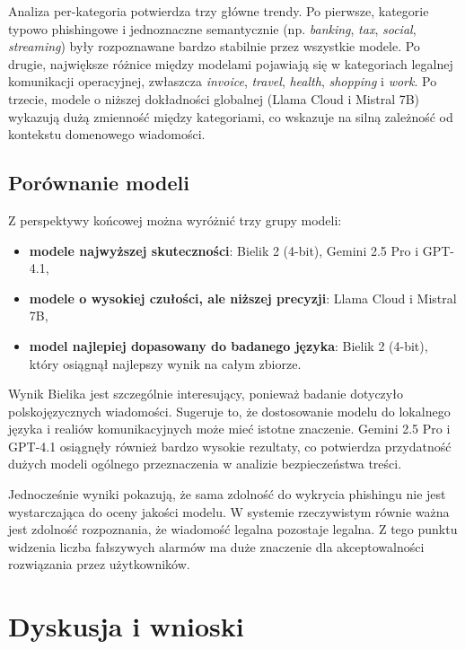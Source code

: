 \documentclass[12pt,a4paper,openright]{report}
\begin{document}
Analiza per-kategoria potwierdza trzy główne trendy. Po pierwsze, kategorie typowo phishingowe i jednoznaczne semantycznie (np. \textit{banking}, \textit{tax}, \textit{social}, \textit{streaming}) były rozpoznawane bardzo stabilnie przez wszystkie modele. Po drugie, największe różnice między modelami pojawiają się w kategoriach legalnej komunikacji operacyjnej, zwłaszcza \textit{invoice}, \textit{travel}, \textit{health}, \textit{shopping} i \textit{work}. Po trzecie, modele o niższej dokładności globalnej (Llama Cloud i Mistral 7B) wykazują dużą zmienność między kategoriami, co wskazuje na silną zależność od kontekstu domenowego wiadomości.

\section{Porównanie modeli}

Z perspektywy końcowej można wyróżnić trzy grupy modeli:

\begin{itemize}
    \item \textbf{modele najwyższej skuteczności}: Bielik 2 (4-bit), Gemini 2.5 Pro i GPT-4.1,
    \item \textbf{modele o wysokiej czułości, ale niższej precyzji}: Llama Cloud i Mistral 7B,
    \item \textbf{model najlepiej dopasowany do badanego języka}: Bielik 2 (4-bit), który osiągnął najlepszy wynik na całym zbiorze.
\end{itemize}

Wynik Bielika jest szczególnie interesujący, ponieważ badanie dotyczyło polskojęzycznych wiadomości. Sugeruje to, że dostosowanie modelu do lokalnego języka i realiów komunikacyjnych może mieć istotne znaczenie. Gemini 2.5 Pro i GPT-4.1 osiągnęły również bardzo wysokie rezultaty, co potwierdza przydatność dużych modeli ogólnego przeznaczenia w analizie bezpieczeństwa treści.

Jednocześnie wyniki pokazują, że sama zdolność do wykrycia phishingu nie jest wystarczająca do oceny jakości modelu. W systemie rzeczywistym równie ważna jest zdolność rozpoznania, że wiadomość legalna pozostaje legalna. Z tego punktu widzenia liczba fałszywych alarmów ma duże znaczenie dla akceptowalności rozwiązania przez użytkowników.

\chapter{Dyskusja i wnioski}
\end{document}
